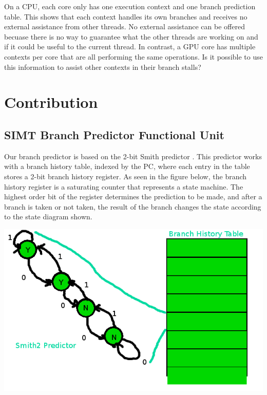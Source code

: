 \documentclass[conference]{IEEEtran}
\begin{document}
On a CPU, each core only has one execution context and one branch prediction table.  This shows that each context handles its own branches and receives no external assistance from other threads.  No external assistance can be offered becuase there is no way to guarantee what the other threads are working on and if it could be useful to the current thread.  In contrast, a GPU core has multiple contexts per core that are all performing the same operations.  Is it possible to use this information to assist other contexts in their branch stalls?

\section{Contribution}

\subsection{SIMT Branch Predictor Functional Unit}

Our branch predictor is based on the 2-bit Smith predictor \cite{smith}.  This predictor works with a branch history table, indexed by the PC, where each 
entry in the table stores a 2-bit branch history register.  As seen in the figure below, the branch history register is a saturating counter that represents a state machine.  
The highest order bit of the register determines the prediction to be made, and after a branch is taken or not taken, the result of the branch 
changes the state according to the state diagram shown.

\begin{center}
	\includegraphics[width=.45\textwidth]{bht.png}
\end{center}
\end{document}
